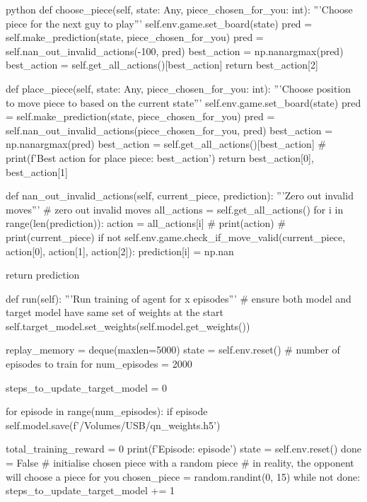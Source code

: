 \begin{mintedbox}{python}
    def choose_piece(self, state: Any, piece_chosen_for_you: int):
        '''Choose piece for the next guy to play'''
        self.env.game.set_board(state)
        pred = self.make_prediction(state, piece_chosen_for_you)
        pred = self.nan_out_invalid_actions(-100, pred)
        best_action = np.nanargmax(pred)
        best_action = self.get_all_actions()[best_action]
        return best_action[2]

    def place_piece(self, state: Any, piece_chosen_for_you: int):
        '''Choose position to move piece to based on the current state'''
        self.env.game.set_board(state)
        pred = self.make_prediction(state, piece_chosen_for_you)
        pred = self.nan_out_invalid_actions(piece_chosen_for_you, pred)
        best_action = np.nanargmax(pred)
        best_action = self.get_all_actions()[best_action]
        # print(f'Best action for place piece: {best_action}')
        return best_action[0], best_action[1]

    def nan_out_invalid_actions(self, current_piece, prediction):
        '''Zero out invalid moves'''
        # zero out invalid moves
        all_actions = self.get_all_actions()
        for i in range(len(prediction)):
            action = all_actions[i]
            # print(action)
            # print(current_piece)
            if not self.env.game.check_if_move_valid(current_piece, action[0], action[1], action[2]):
                prediction[i] = np.nan

        return prediction

    def run(self):
        '''Run training of agent for x episodes'''
        # ensure both model and target model have same set of weights at the start
        self.target_model.set_weights(self.model.get_weights())

        replay_memory = deque(maxlen=5000)
        state = self.env.reset()
        # number of episodes to train for
        num_episodes = 2000

        steps_to_update_target_model = 0

        for episode in range(num_episodes):
            if episode %
                self.model.save(f'/Volumes/USB/qn_weights.h5')

            total_training_reward = 0
            print(f'Episode: {episode}')
            state = self.env.reset()
            done = False
            # initialise chosen piece with a random piece
            # in reality, the opponent will choose a piece for you
            chosen_piece = random.randint(0, 15)
            while not done:
                steps_to_update_target_model += 1


\end{mintedbox}
